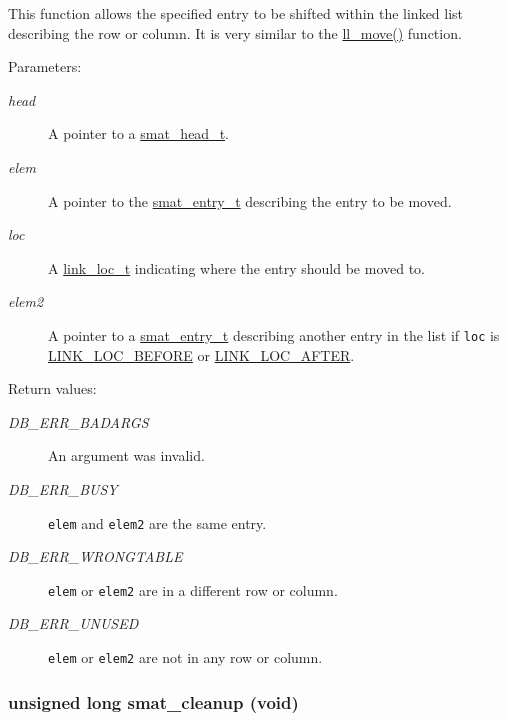 This function allows the specified entry to be shifted within the linked list describing the row or column. It is very similar to the \hyperlink{group__dbprim__link_a7}{ll\_\-move()} function.\begin{Desc}
\item[Parameters: ]\par
\begin{description}
\item[{\em 
head}]A pointer to a \hyperlink{group__dbprim__smat_a1}{smat\_\-head\_\-t}. \item[{\em 
elem}]A pointer to the \hyperlink{group__dbprim__smat_a2}{smat\_\-entry\_\-t} describing the entry to be moved. \item[{\em 
loc}]A \hyperlink{group__dbprim__link_a4}{link\_\-loc\_\-t} indicating where the entry should be moved to. \item[{\em 
elem2}]A pointer to a \hyperlink{group__dbprim__smat_a2}{smat\_\-entry\_\-t} describing another entry in the list if {\tt loc} is \hyperlink{group__dbprim__link_a26a133}{LINK\_\-LOC\_\-BEFORE} or \hyperlink{group__dbprim__link_a26a134}{LINK\_\-LOC\_\-AFTER}.\end{description}
\end{Desc}
\begin{Desc}
\item[Return values: ]\par
\begin{description}
\item[{\em 
DB\_\-ERR\_\-BADARGS}]An argument was invalid. \item[{\em 
DB\_\-ERR\_\-BUSY}]{\tt elem} and {\tt elem2} are the same entry. \item[{\em 
DB\_\-ERR\_\-WRONGTABLE}]{\tt elem} or {\tt elem2} are in a different row or column. \item[{\em 
DB\_\-ERR\_\-UNUSED}]{\tt elem} or {\tt elem2} are not in any row or column. \end{description}
\end{Desc}
\hypertarget{group__dbprim__smat_a7}{
\subsubsection[smat\_\-cleanup]{\setlength{\rightskip}{0pt plus 5cm}unsigned long smat\_\-cleanup (void)}}
\label{group__dbprim__smat_a7}


